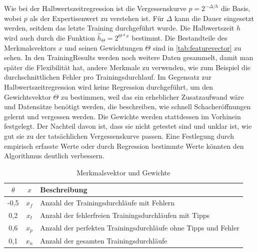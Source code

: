 
Wie bei der Halbwertszeitregression ist die Vergessenskurve $p = 2^{-\Delta/h}$ die Basis, wobei $p$ als der Expertisenwert zu verstehen ist. Für $\Delta$ kann die Dauer eingesetzt werden, seitdem das letzte Training durchgeführt wurde.
Die Halbwertszeit $h$ wird auch durch die Funktion $\hat{h}_\Theta = 2^{\Theta*x}$ bestimmt.
Die Bestandteile des Merkmalsvektors $x$ und seinen Gewichtungen $\Theta$ sind in \autoref{tab:featurevector} zu sehen.
In den TrainingResults werden noch weitere Daten gesammelt, damit man später die Flexibilität hat, andere Merkmale zu verwenden, wie zum Beispiel die durchschnittlichen Fehler pro Trainingsdurchlauf.
Im Gegensatz zur Halbwertszeitregression wird keine Regression durchgeführt, um den Gewichtsvektor $\Theta$ zu bestimmen, weil das ein erheblicher Zusatzaufwand wäre und Datensätze benötigt werden, die beschreiben, wie schnell Schacheröffnungen gelernt und vergessen werden. Die Gewichte werden stattdessen im Vorhinein festgelegt. Der Nachteil davon ist, dass sie nicht getestet sind und unklar ist, wie gut sie zu der tatsächlichen Vergessenskurve passen. Eine Festlegung durch empirisch erfasste Werte oder durch Regression bestimmte Werte könnten den Algorithmus deutlich verbessern.

\begin{table}[b]
    \centering
    \begin{tabular}{|c|c|l|}
        \hline
        $\theta$ & $x$ & Beschreibung \\
        \hline
        -0,5 & $x_f$ & Anzahl der Trainingsdurchläufe mit Fehlern \\
        \hline
        0,2 & $x_t$ & Anzahl der fehlerfreien Trainingsdurchläufen mit Tipps \\
        \hline
        0,6 & $x_p$ & Anzahl der perfekten Trainingsdurchläufe ohne Tipps und Fehler \\
        \hline
        0,1 & $x_n$ & Anzahl der gesamten Trainingsdurchläufe \\
        \hline
    \end{tabular}
    \caption{Merkmalsvektor und Gewichte}
    \label{tab:featurevector}
\end{table}

